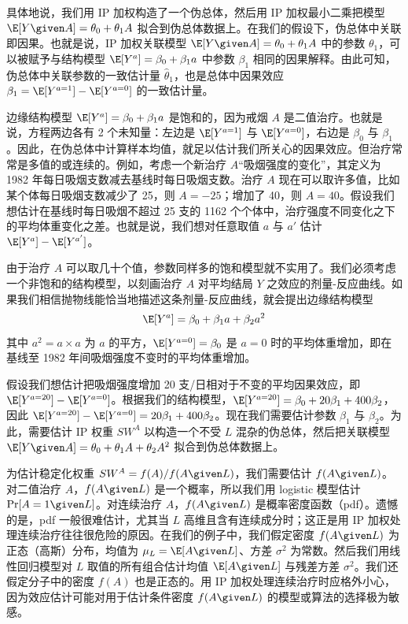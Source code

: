 具体地说，我们用 IP 加权构造了一个伪总体，然后用 IP 加权最小二乘把模型 $\E[Y\given A]=\theta_0+\theta_1A$ 拟合到伪总体数据上。在我们的假设下，伪总体中关联即因果。也就是说，IP 加权关联模型 $\E[Y\given A]=\theta_0+\theta_1A$ 中的参数 $\theta_1$，可以被赋予与结构模型 $\E[Y^{a}]=\beta_0+\beta_1a$ 中参数 $\beta_1$ 相同的因果解释。由此可知，伪总体中关联参数的一致估计量 $\hat\theta_1$，也是总体中因果效应 $\beta_1=\E[Y^{a=1}]-\E[Y^{a=0}]$ 的一致估计量。

边缘结构模型 $\E[Y^{a}]=\beta_0+\beta_1a$ 是饱和的，因为戒烟 $A$ 是二值治疗。也就是说，方程两边各有 2 个未知量：左边是 $\E[Y^{a=1}]$ 与 $\E[Y^{a=0}]$，右边是 $\beta_0$ 与 $\beta_1$。因此，在伪总体中计算样本均值，就足以估计我们所关心的因果效应。但治疗常常是多值的或连续的。例如，考虑一个新治疗 $A$“吸烟强度的变化”，其定义为 1982 年每日吸烟支数减去基线时每日吸烟支数。治疗 $A$ 现在可以取许多值，比如某个体每日吸烟支数减少了 25，则 $A=-25$；增加了 40，则 $A=40$。假设我们想估计在基线时每日吸烟不超过 25 支的 1162 个个体中，治疗强度不同变化之下的平均体重变化之差。也就是说，我们想对任意取值 $a$ 与 $a'$ 估计 $\E[Y^{a}]-\E[Y^{a'}]$。

由于治疗 $A$ 可以取几十个值，参数同样多的饱和模型就不实用了。我们必须考虑一个非饱和的结构模型，以刻画治疗 $A$ 对平均结局 $Y$ 之效应的剂量-反应曲线。如果我们相信抛物线能恰当地描述这条剂量-反应曲线，就会提出边缘结构模型
\[
\E[Y^{a}]=\beta_0+\beta_1a+\beta_2a^2
\]
其中 $a^2=a\times a$ 为 $a$ 的平方，$\E[Y^{a=0}]=\beta_0$ 是 $a=0$ 时的平均体重增加，即在基线至 1982 年间吸烟强度不变时的平均体重增加。

假设我们想估计把吸烟强度增加 20 支/日相对于不变的平均因果效应，即 $\E[Y^{a=20}]-\E[Y^{a=0}]$。根据我们的结构模型，$\E[Y^{a=20}]=\beta_0+20\beta_1+400\beta_2$，因此 $\E[Y^{a=20}]-\E[Y^{a=0}]=20\beta_1+400\beta_2$。现在我们需要估计参数 $\beta_1$ 与 $\beta_2$。为此，需要估计 IP 权重 $SW^{A}$ 以构造一个不受 $L$ 混杂的伪总体，然后把关联模型 $\E[Y\given A]=\theta_0+\theta_1A+\theta_2A^2$ 拟合到伪总体数据上。

为估计稳定化权重 $SW^{A}=f(A)/f(A\given L)$，我们需要估计 $f(A\given L)$。对二值治疗 $A$，$f(A\given L)$ 是一个概率，所以我们用 logistic 模型估计 $\Pr[A=1\given L]$。对连续治疗 $A$，$f(A\given L)$ 是概率密度函数（pdf）。遗憾的是，pdf 一般很难估计，尤其当 $L$ 高维且含有连续成分时；这正是用 IP 加权处理连续治疗往往很危险的原因。在我们的例子中，我们假定密度 $f(A\given L)$ 为正态（高斯）分布，均值为 $\mu_L=\E[A\given L]$、方差 $\sigma^2$ 为常数。然后我们用线性回归模型对 $L$ 取值的所有组合估计均值 $\E[A\given L]$ 与残差方差 $\sigma^2$。我们还假定分子中的密度 $f(A)$ 也是正态的。用 IP 加权处理连续治疗时应格外小心，因为效应估计可能对用于估计条件密度 $f(A\given L)$ 的模型或算法的选择极为敏感。


